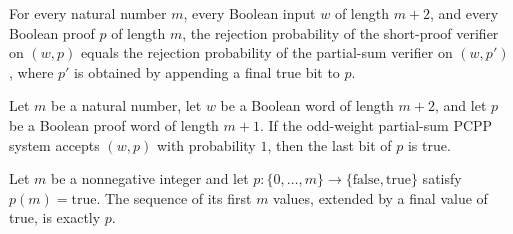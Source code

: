 \begin{theorem}
\label{FABL.oddWeightShortProofPCPPSystem_rejectionProbability}
\leanok
{}
For every natural number $m$, every Boolean input $w$ of length $m+2$, and every Boolean
proof $p$ of length $m$, the rejection probability of the short-proof verifier on
$(w,p)$ equals the rejection probability of the partial-sum verifier on $(w,p')$, where
$p'$ is obtained by appending a final true bit to $p$.
\end{theorem}

\begin{theorem}
\label{FABL.finalProofBit_eq_true_of_acceptanceProbability_eq_one}
\leanok
{}
Let $m$ be a natural number, let $w$ be a Boolean word of length $m+2$, and let $p$ be a
Boolean proof word of length $m+1$. If the odd-weight partial-sum PCPP system accepts
$(w,p)$ with probability $1$, then the last bit of $p$ is true.
\end{theorem}

\begin{theorem}
\label{FABL.extendProofWithFinalTrue_init}
\leanok
{}
Let $m$ be a nonnegative integer and let
$p:\{0,\ldots,m\}\to\{\mathrm{false},\mathrm{true}\}$ satisfy $p(m)=\mathrm{true}$. The
sequence of its first $m$ values, extended by a final value of true, is exactly $p$.
\end{theorem}

